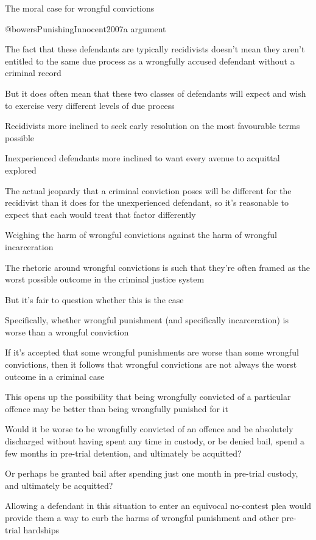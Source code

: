 The moral case for wrongful convictions

@bowersPunishingInnocent2007a argument

The fact that these defendants are typically recidivists doesn't mean they aren't entitled to the same due process as a wrongfully accused defendant without a criminal record

But it does often mean that these two classes of defendants will expect and wish to exercise very different levels of due process

Recidivists more inclined to seek early resolution on the most favourable terms possible

Inexperienced defendants more inclined to want every avenue to acquittal explored

The actual jeopardy that a criminal conviction poses will be different for the recidivist than it does for the unexperienced defendant, so it's reasonable to expect that each would treat that factor differently

Weighing the harm of wrongful convictions against the harm of wrongful incarceration

The rhetoric around wrongful convictions is such that they're often framed as the worst possible outcome in the criminal justice system

But it's fair to question whether this is the case

Specifically, whether wrongful punishment (and specifically incarceration) is worse than a wrongful conviction

If it's accepted that some wrongful punishments are worse than some wrongful convictions, then it follows that wrongful convictions are not always the worst outcome in a criminal case

This opens up the possibility that being wrongfully convicted of a particular offence may be better than being wrongfully punished for it

Would it be worse to be wrongfully convicted of an offence and be absolutely discharged without having spent any time in custody, or be denied bail, spend a few months in pre-trial detention, and ultimately be acquitted?

Or perhaps be granted bail after spending just one month in pre-trial custody, and ultimately be acquitted?

Allowing a defendant in this situation to enter an equivocal no-contest plea would provide them a way to curb the harms of wrongful punishment and other pre-trial hardships


